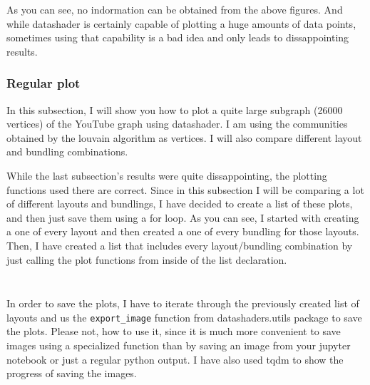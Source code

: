 \documentclass[12pt, a4paper]{article}
\begin{document}
As you can see, no indormation can be obtained from the above figures. And while datashader is certainly capable of plotting a huge amounts of data points, sometimes using that capability is a bad idea and only leads to dissappointing results.

\subsubsection{Regular plot}


In this subsection, I will show you how to plot a quite large subgraph (26000 vertices) of the YouTube graph using datashader. I am using the communities obtained by the louvain algorithm as vertices. I will also compare different layout and bundling combinations.


While the last subsection's results were quite dissappointing, the plotting functions used there are correct. Since in this subsection I will be comparing a lot of different layouts and bundlings, I have decided to create a list of these plots, and then just save them using a for loop. As you can see, I started with creating a one of every layout and then created a one of every bundling for those layouts. Then, I have created a list that includes every layout/bundling combination by just calling the plot functions from inside of the list declaration.

\bgroup
  \inputminted[linenos, breaklines=true, fontsize=\scriptsize]{python}{src/youtube/datashader/simple/2a_layouts.py}
  \label{listing:youtube_lgr_2a}
\egroup

\bgroup
  \inputminted[linenos, breaklines=true, fontsize=\scriptsize]{python}{src/youtube/datashader/simple/2b_showcase.py}
  \label{listing:youtube_lgr_2b}
\egroup


In order to save the plots, I have to iterate through the previously created list of layouts and us the \texttt{export\_image} function from datashaders.utils package to save the plots. Please not, how to use it, since it is much more convenient to save images using a specialized function than by saving an image from your jupyter notebook or just a regular python output. I have also used tqdm to show the progress of saving the images.
\end{document}
